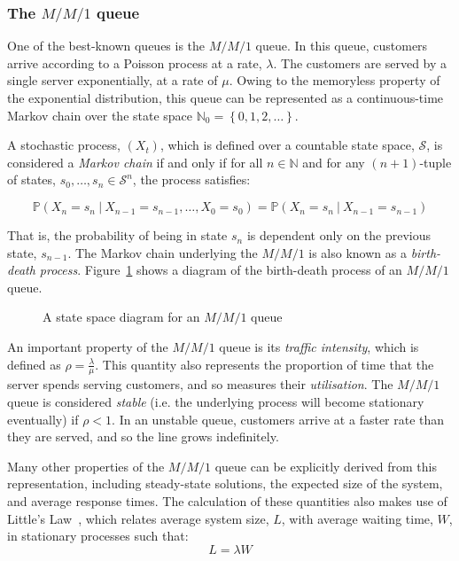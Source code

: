 \subsubsection{The \(M/M/1\) queue}

One of the best-known queues is the \(M/M/1\) queue. In this queue, customers
arrive according to a Poisson process at a rate, \(\lambda\). The customers are
served by a single server exponentially, at a rate of \(\mu\). Owing to the
memoryless property of the exponential distribution, this queue can be
represented as a continuous-time Markov chain over the state space
\(\mathbb{N}_0 = \left\{0, 1, 2, \ldots\right\}\).

A stochastic process, \(\left(X_t\right)\), which is defined over a countable
state space, \(\mathcal S\), is considered a \emph{Markov chain} if and only if
for all \(n \in \mathbb N\) and for any \((n+1)\)-tuple of states, \(s_0,
\ldots, s_n \in \mathcal S^n\), the process satisfies:

\begin{equation}
    \mathbb P \left(X_n = s_n \ | \ X_{n-1} = s_{n-1}, \ldots, X_0 = s_0\right)
    = \mathbb P \left(X_n = s_n \ | \ X_{n-1} = s_{n-1}\right)
\end{equation}

That is, the probability of being in state \(s_n\) is dependent only on the
previous state, \(s_{n-1}\). The Markov chain underlying the \(M/M/1\) is also
known as a \emph{birth-death process}. Figure~\ref{fig:birth_death_mm1} shows a
diagram of the birth-death process of an \(M/M/1\) queue.

\begin{figure}[htbp]
    \centering
    \resizebox{\imgwidth}{!}{%
        
    }\caption{
        A state space diagram for an \(M/M/1\) queue%
    }\label{fig:birth_death_mm1}
\end{figure}

An important property of the \(M/M/1\) queue is its \emph{traffic intensity},
which is defined as \(\rho = \frac{\lambda}{\mu}\). This quantity also
represents the proportion of time that the server spends serving customers, and
so measures their \emph{utilisation}. The \(M/M/1\) queue is considered
\emph{stable} (i.e. the underlying process will become stationary eventually) if
\(\rho < 1\). In an unstable queue, customers arrive at a faster rate than they
are served, and so the line grows indefinitely.

Many other properties of the \(M/M/1\) queue can be explicitly derived from this
representation, including steady-state solutions, the expected size of the
system, and average response times. The calculation of these quantities also
makes use of Little's Law~\cite{Little1961}, which relates average system size,
\(L\), with average waiting time, \(W\), in stationary processes such that:
\begin{equation}
    L = \lambda W
\end{equation}

